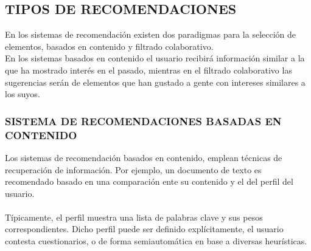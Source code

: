 \documentclass[11pt,a4paper]{article}
\begin{document}
		 \subsection{TIPOS DE RECOMENDACIONES}	
		 
		 En los sistemas de recomendación existen dos paradigmas para la selección de elementos, basados en contenido y filtrado colaborativo. %
		 \\
		 En los sistemas basados en contenido el usuario recibirá información similar a la que ha mostrado interés en el pasado, mientras en el filtrado colaborativo las sugerencias serán de elementos que han gustado a gente con intereses similares a los suyos.
		 
		 \subsubsection{SISTEMA DE RECOMENDACIONES BASADAS EN CONTENIDO}
		 
		 Los sistemas de recomendación basados en contenido, emplean técnicas de recuperación de información. Por ejemplo, un documento de texto es recomendado basado en una comparación ente su contenido y el del perfil del usuario.\\
		 \\
		 Típicamente, el perfil muestra una lista de palabras clave y sus pesos correspondientes. Dicho perfil puede ser definido explícitamente, el usuario contesta cuestionarios, o de forma semiautomática en base a diversas heurísticas.
	 	
	 	
	 	
	 	
	 		
\end{document}

